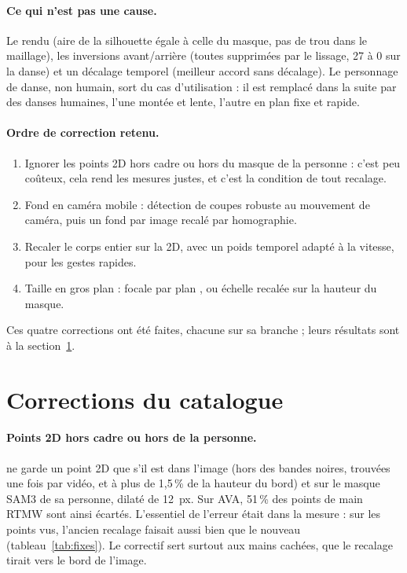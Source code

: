 \documentclass[11pt,a4paper]{report}
\newcommand{\code}[1]{\texttt{\detokenize{#1}}}
\begin{document}
\paragraph{Ce qui n'est pas une cause.} Le rendu (aire de la silhouette égale à celle du masque, pas de trou dans le maillage), les
inversions avant/arrière (toutes supprimées par le lissage, 27 à 0 sur la danse) et un décalage temporel (meilleur accord sans
décalage). Le personnage de danse, non humain, sort du cas d'utilisation : il est remplacé dans la suite par des danses humaines, l'une
montée et lente, l'autre en plan fixe et rapide.

\paragraph{Ordre de correction retenu.}
\begin{enumerate}
    \item Ignorer les points 2D hors cadre ou hors du masque de la personne : c'est peu coûteux, cela rend les mesures justes, et
    c'est la condition de tout recalage.
    \item Fond en caméra mobile : détection de coupes robuste au mouvement de caméra, puis un fond par image recalé par homographie.
    \item Recaler le corps entier sur la 2D, avec un poids temporel adapté à la vitesse, pour les gestes rapides.
    \item Taille en gros plan : focale par plan \cite{hao2025perspose}, ou échelle recalée sur la hauteur du masque.
\end{enumerate}

Ces quatre corrections ont été faites, chacune sur sa branche ; leurs résultats sont à la section~\ref{sec:res-fixes}.

\section{Corrections du catalogue}
\label{sec:res-fixes}

\paragraph{Points 2D hors cadre ou hors de la personne.} \code{keypoint_view.py} ne garde un point 2D que s'il est dans l'image
(hors des bandes noires, trouvées une fois par vidéo, et à plus de 1,5\,\% de la hauteur du bord) et sur le masque SAM3 de sa personne,
dilaté de 12~px. Sur AVA, 51\,\% des points de main RTMW sont ainsi écartés. L'essentiel de l'erreur était dans la mesure : sur les
points vus, l'ancien recalage faisait aussi bien que le nouveau (tableau~\ref{tab:fixes}). Le correctif sert surtout aux mains
cachées, que le recalage tirait vers le bord de l'image.
\end{document}
